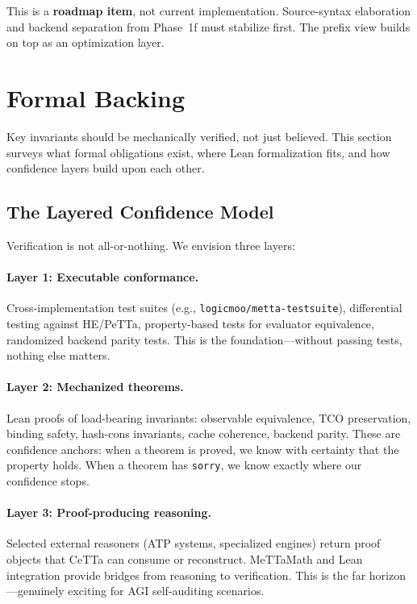 \documentclass[11pt]{article}
\newcommand{\code}[1]{\texttt{#1}}
\newcommand{\PeTTa}{\textup{PeTTa}}
\newcommand{\HE}{\textup{HE}}
\newcommand{\CeTTa}{\textup{CeTTa}}
\begin{document}
This is a \textbf{roadmap item}, not current implementation.  Source-syntax
elaboration and backend separation from Phase~1f must stabilize first.
The prefix view builds on top as an optimization layer.

\section{Formal Backing}
\label{sec:formal}

Key invariants should be mechanically verified, not just believed.
This section surveys what formal obligations exist, where Lean
formalization fits, and how confidence layers build upon each other.

\subsection{The Layered Confidence Model}

Verification is not all-or-nothing.  We envision three layers:

\paragraph{Layer 1: Executable conformance.}
Cross-implementation test suites (e.g., \code{logicmoo/metta-testsuite}),
differential testing against \HE{}/\PeTTa{}, property-based tests for
evaluator equivalence, randomized backend parity tests.  This is the
foundation---without passing tests, nothing else matters.

\paragraph{Layer 2: Mechanized theorems.}
Lean proofs of load-bearing invariants: observable equivalence, TCO
preservation, binding safety, hash-cons invariants, cache coherence,
backend parity.  These are confidence anchors: when a theorem is proved,
we know with certainty that the property holds.  When a theorem has
\code{sorry}, we know exactly where our confidence stops.

\paragraph{Layer 3: Proof-producing reasoning.}
Selected external reasoners (ATP systems, specialized engines) return
proof objects that \CeTTa{} can consume or reconstruct.  MeTTaMath and
Lean integration provide bridges from reasoning to verification.  This
is the far horizon---genuinely exciting for AGI self-auditing scenarios.
\end{document}
